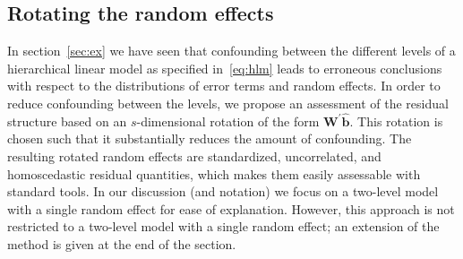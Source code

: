 \documentclass[12pt]{article} %
\newcommand{\hh}[1]{{\color{orange} #1}}
\newcommand{\al}[1]{{\color{red} #1}}
\begin{document}
\subsection{Rotating the random effects}\label{sec:rotate}
\noindent
\hh{In section~\ref{sec:ex} we have seen that confounding between the different levels of a hierarchical linear model as specified in~\eqref{eq:hlm} leads to erroneous conclusions with respect to the distributions of error terms and random effects. In order to reduce confounding between the levels, we propose an assessment of the residual structure based on an $s$-dimensional rotation of the form $\bm{W}^{\prime} \widehat{\bm{b}}$. This rotation is chosen such that it substantially reduces the amount of confounding. The resulting rotated random effects are standardized, uncorrelated, and homoscedastic residual quantities, which makes them easily assessable with standard tools. In our discussion (and notation) we focus on a two-level model with a single random effect for ease of explanation. However, this approach is not restricted to a two-level model with a single random effect; an extension of the method is given at the end of the section.
}
%
%
\end{document}
